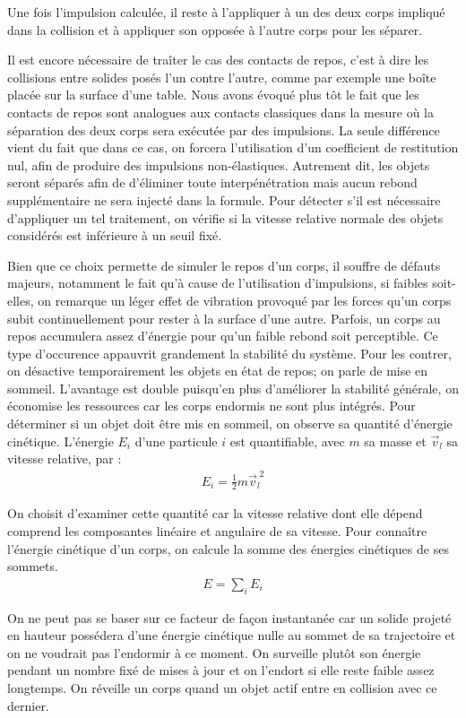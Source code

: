 Une fois l'impulsion calculée, il reste à l'appliquer à un des deux
corps impliqué dans la collision et à appliquer son opposée à l'autre
corps pour les séparer.

Il est encore nécessaire de traîter le cas des contacts de repos,
c'est à dire les collisions entre solides posés l'un contre l'autre,
comme par exemple une boîte placée sur la surface d'une table. Nous
avons évoqué plus tôt le fait que les contacts de repos sont analogues
aux contacts classiques dans la mesure o\`u la séparation des deux
corps sera exécutée par des impulsions. La seule différence vient du
fait que dans ce cas, on forcera l'utilisation d'un coefficient de
restitution nul, afin de produire des impulsions
non-élastiques. Autrement dit, les objets seront séparés afin de
d'éliminer toute interpénétration mais aucun rebond supplémentaire ne
sera injecté dans la formule. Pour détecter s'il est nécessaire
d'appliquer un tel traitement, on vérifie si la vitesse relative
normale des objets considérés est inférieure à un seuil fixé.

Bien que ce choix permette de simuler le repos d'un corps, il souffre
de défauts majeurs, notamment le fait qu'à cause de l'utilisation
d'impulsions, si faibles soit-elles, on remarque un léger effet de
vibration provoqué par les forces qu'un corps subit continuellement
pour rester à la surface d'une autre. Parfois, un corps au repos
accumulera assez d'énergie pour qu'un faible rebond soit
perceptible. Ce type d'occurence appauvrit grandement la stabilité du
système. Pour les contrer, on désactive temporairement les objets en
état de repos; on parle de mise en sommeil. L'avantage est double
puisqu'en plus d'améliorer la stabilité générale, on économise les
ressources car les corps endormis ne sont plus intégrés. Pour
déterminer si un objet doit être mis en sommeil, on observe sa
quantité d'énergie cinétique. L'énergie $E_i$ d'une particule $i$ est
quantifiable, avec $m$ sa masse et $\vec{v}_l$ sa vitesse relative,
par :
\begin{align*}
  E_i = \frac{1}{2} m \vec{v}^{\;2}_l
\end{align*}

On choisit d'examiner cette quantité car la vitesse relative dont elle
dépend comprend les composantes linéaire et angulaire de sa
vitesse. Pour connaître l'énergie cinétique d'un corps, on calcule la
somme des énergies cinétiques de ses sommets.
\begin{align*}
  E = \sum_i E_i
\end{align*}

On ne peut pas se baser sur ce facteur de façon instantanée car un
solide projeté en hauteur possédera d'une énergie cinétique nulle au
sommet de sa trajectoire et on ne voudrait pas l'endormir à ce
moment. On surveille plutôt son énergie pendant un nombre fixé de
mises à jour et on l'endort si elle reste faible assez longtemps. On
réveille un corps quand un objet actif entre en collision avec ce
dernier.
